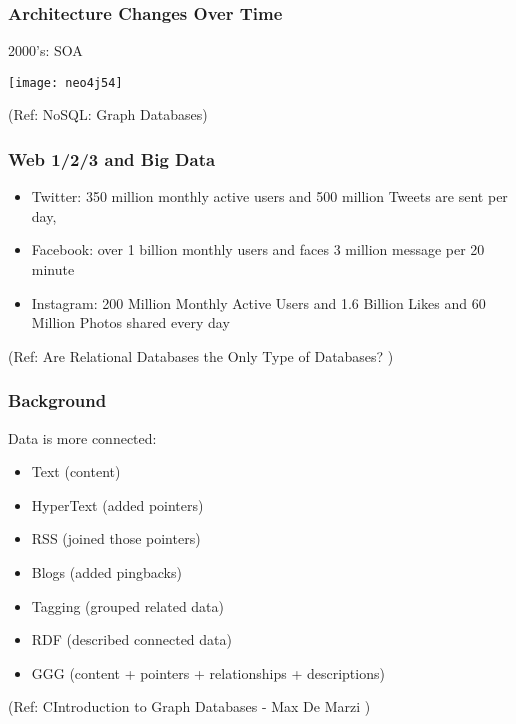 \begin{frame}\frametitle{Architecture Changes Over Time }
2000’s: SOA



\begin{center}
\texttt{[image: neo4j54]}
\end{center}	

{\tiny (Ref: NoSQL: Graph Databases)}

\end{frame}


\begin{frame}\frametitle{Web 1/2/3 and Big Data}


\begin{itemize}
\item Twitter: 350 million monthly active users and 500 million Tweets are sent per day,
\item Facebook: over 1 billion monthly users and faces 3 million message per 20 minute
\item Instagram: 200 Million Monthly Active Users and 1.6 Billion Likes and 60 Million Photos shared every day

\end{itemize}


{\tiny (Ref: Are Relational Databases the Only Type of Databases? )}
\end{frame}


\begin{frame}\frametitle{Background}

Data is more connected:

\begin{itemize}
\item Text (content)
\item  HyperText (added pointers)
\item  RSS (joined those pointers)
\item Blogs (added pingbacks)
\item Tagging (grouped related data)
\item RDF (described connected data)
\item GGG (content + pointers + relationships + descriptions)
\end{itemize}

 

{\tiny (Ref: CIntroduction to Graph Databases - Max De Marzi )}
\end{frame}


